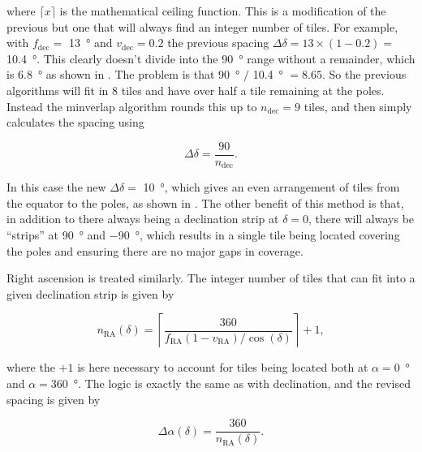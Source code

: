 \begin{colsection}
\begin{colsection}
where $\lceil x \rceil$ is the mathematical ceiling function. This is a modification of the previous  but one that will always find an integer number of tiles. For example, with $f_\text{dec} = $ \SI{13}{\degree} and $v_\text{dec} = 0.2$ the previous spacing $\Delta\delta = 13 \times (1-0.2) = $ \SI{10.4}{\degree}. This clearly doesn't divide into the \SI{90}{\degree} range without a remainder, which is \SI{6.8}{\degree} as shown in . The problem is that \SI{90}{\degree} $/$ \SI{10.4}{\degree} $= 8.65$. So the previous algorithms will fit in 8 tiles and have over half a tile remaining at the poles. Instead the minverlap algorithm rounds this up to $n_\text{dec} = 9$ tiles, and then simply calculates the spacing using

\begin{equation}
    \Delta\delta = \frac{90}{n_\text{dec}}.
    \label{eq:minverlap_deltadelta}
\end{equation}

In this case the new $\Delta\delta = $ \SI{10}{\degree}, which gives an even arrangement of tiles from the equator to the poles, as shown in . The other benefit of this method is that, in addition to there always being a declination strip at $\delta=0$, there will always be ``strips'' at \SI{+90}{\degree} and \SI{-90}{\degree}, which results in a single tile being located covering the poles and ensuring there are no major gaps in coverage.

Right ascension is treated similarly. The integer number of tiles that can fit into a given declination strip is given by

\begin{equation}
    n_\text{RA}(\delta) = \left \lceil \frac{360}{f_\text{RA}(1-v_\text{RA})/\cos(\delta)} \right \rceil + 1,
    \label{eq:minverlap_nra}
\end{equation}

where the $+1$ is here necessary to account for tiles being located both at $\alpha=$\SI{0}{\degree} and $\alpha=$\SI{360}{\degree}. The logic is exactly the same as with declination, and the revised spacing is given by

\begin{equation}
    \Delta\alpha(\delta) = \frac{360}{n_\text{RA}(\delta)}.
    \label{eq:minverlap_deltaalpha}
\end{equation}


\end{colsection}
\end{colsection}
